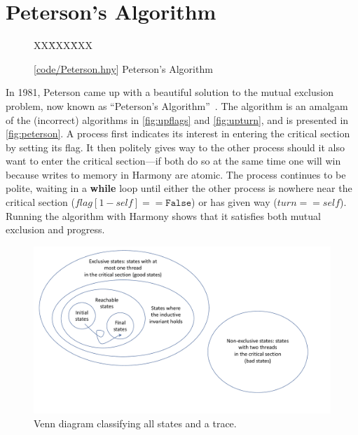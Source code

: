 \documentclass{report}
\newcommand{\harmonysource}[1]{
\begin{tabbing}
XX\=XXX\=XXX\kill
    
\end{tabbing}
}
\newcommand{\harmonylink}[1]{%
[\href{https://www.cs.cornell.edu/home/rvr/harmony/#1}{\underline{#1}}]%
}
\newenvironment{code}{
\tcolorbox
}{
\endtcolorbox
}
\begin{document}
\chapter{Peterson's Algorithm}
\label{ch:peterson}
%

\begin{figure}
\begin{code}
\harmonysource{Peterson}
\end{code}
\caption{\harmonylink{code/Peterson.hny} Peterson's Algorithm}
\label{fig:peterson}
\end{figure}

In 1981, Peterson came up with a beautiful solution to the mutual exclusion
problem, now known as ``Peterson's Algorithm''~\cite{Peterson81}.
The algorithm is an amalgam of the (incorrect) algorithms in
\autoref{fig:upflags} and \autoref{fig:upturn}, and is presented
in \autoref{fig:peterson}.
A process first indicates its interest in entering the critical section
by setting its flag.
It then politely gives way to the other process should it also want to
enter the critical section---if both do so at the same time one will
win because writes to memory in Harmony are atomic.
The process continues to be polite, waiting in a \textbf{while} loop
until either the other process is nowhere near the critical section
($\mathit{flag}[1 - \mathit{self}] == \mathtt{False}$) or has given way
($\mathit{turn} == \mathit{self}$).
Running the algorithm with Harmony shows that it satisfies both mutual
exclusion and progress.

\begin{figure}
\begin{center}
\includegraphics[width=6in]{figures/states-crop.pdf}
\end{center}
\caption{Venn diagram classifying all states and a trace.}
\label{fig:states}
\end{figure}
\end{document}
